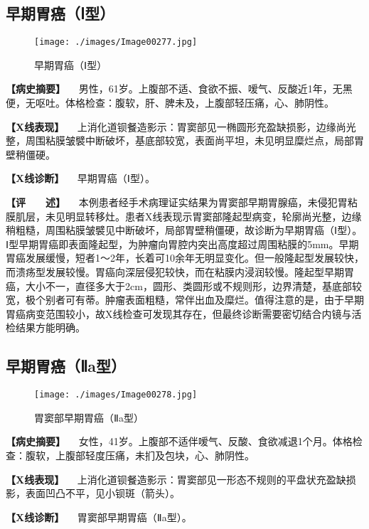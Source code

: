 \subsection{早期胃癌（Ⅰ型）}

\begin{figure}[!htbp]
 \centering
 \texttt{[image: ./images/Image00277.jpg]}
 \captionsetup{justification=centering}
 \caption{早期胃癌（Ⅰ型）}
 \label{fig5-3-15}
  \end{figure} 

\textbf{【病史摘要】}
　男性，61岁。上腹部不适、食欲不振、嗳气、反酸近1年，无黑便，无呕吐。体格检查：腹软，肝、脾未及，上腹部轻压痛，心、肺阴性。

\textbf{【X线表现】}
　上消化道钡餐造影示：胃窦部见一椭圆形充盈缺损影，边缘尚光整，周围粘膜皱襞中断破坏，基底部较宽，表面尚平坦，未见明显糜烂点，局部胃壁稍僵硬。

\textbf{【X线诊断】} 　早期胃癌（Ⅰ型）。

\textbf{【评　　述】}
　本例患者经手术病理证实结果为胃窦部早期胃腺癌，未侵犯胃粘膜肌层，未见明显转移灶。患者X线表现示胃窦部隆起型病变，轮廓尚光整，边缘稍粗糙，周围粘膜皱襞见中断破坏，局部胃壁稍僵硬，故诊断为早期胃癌（Ⅰ型）。Ⅰ型早期胃癌即表面隆起型，为肿瘤向胃腔内突出高度超过周围粘膜的5mm。早期胃癌发展缓慢，短者1～2年，长着可10余年无明显变化。但一般隆起型发展较快，而溃疡型发展较慢。胃癌向深层侵犯较快，而在粘膜内浸润较慢。隆起型早期胃癌，大小不一，直径多大于2cm，圆形、类圆形或不规则形，边界清楚，基底部较宽，极个别者可有蒂。肿瘤表面粗糙，常伴出血及糜烂。值得注意的是，由于早期胃癌病变范围较小，故X线检查可发现其存在，但最终诊断需要密切结合内镜与活检结果方能明确。

\subsection{早期胃癌（Ⅱa型）}

\begin{figure}[!htbp]
 \centering
 \texttt{[image: ./images/Image00278.jpg]}
 \captionsetup{justification=centering}
 \caption{胃窦部早期胃癌（Ⅱa型）}
 \label{fig5-3-16}
  \end{figure} 

\textbf{【病史摘要】}
　女性，41岁。上腹部不适伴嗳气、反酸、食欲减退1个月。体格检查：腹软，上腹部轻度压痛，未扪及包块，心、肺阴性。

\textbf{【X线表现】}
　上消化道钡餐造影示：胃窦部见一形态不规则的平盘状充盈缺损影，表面凹凸不平，见小钡斑（箭头）。

\textbf{【X线诊断】} 　胃窦部早期胃癌（Ⅱa型）。


